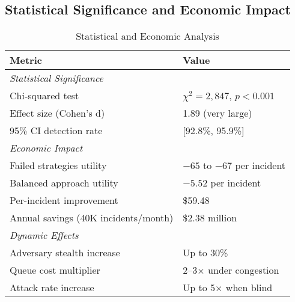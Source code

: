 \documentclass[10pt,conference]{IEEEtran}
\begin{document}
\subsection{Statistical Significance and Economic Impact}

\begin{table}[!h]
\centering
\caption{Statistical and Economic Analysis}
\footnotesize
\begin{tabular}{@{}ll@{}}
\toprule
\textbf{Metric} & \textbf{Value} \\
\midrule
\multicolumn{2}{l}{\textit{Statistical Significance}} \\
Chi-squared test & $\chi^2 = 2,847$, $p < 0.001$ \\
Effect size (Cohen's d) & 1.89 (very large) \\
95\% CI detection rate & [92.8\%, 95.9\%] \\
\midrule
\multicolumn{2}{l}{\textit{Economic Impact}} \\
Failed strategies utility & $-65$ to $-67$ per incident \\
Balanced approach utility & $-5.52$ per incident \\
\rowcolor{ieeegreen!10}
Per-incident improvement & \$59.48 \\
\rowcolor{ieeegreen!10}
Annual savings (40K incidents/month) & \$2.38 million \\
\midrule
\multicolumn{2}{l}{\textit{Dynamic Effects}} \\
Adversary stealth increase & Up to 30\% \\
Queue cost multiplier & 2--3$\times$ under congestion \\
Attack rate increase & Up to 5$\times$ when blind \\
\bottomrule
\end{tabular}
\end{table}
\end{document}

